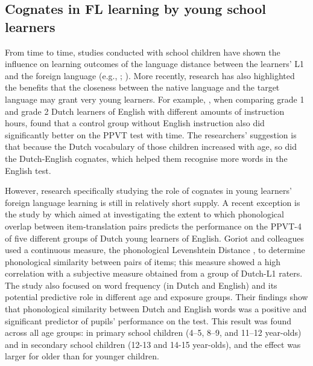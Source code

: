 \documentclass[output=paper,modfonts,nonflat,newtxmath]{langsci/langscibook}
\begin{document}
\subsection{Cognates in FL learning by young school learners}

From time to time, studies conducted with school children have shown the influence on learning outcomes of the language distance between the learners’ L1 and the foreign language (e.g., \citealt{BildSwain1989}; \citealt{DYdewallevandePoel1999}). More recently, research has also highlighted the benefits that the closeness between the native language and the target language may grant very young learners. For example, \citet{UnsworthEtAl2015}, when comparing grade 1 and grade 2 Dutch learners of English with different amounts of instruction hours, found that a control group without English instruction also did significantly better on the PPVT test with time. The researchers’ suggestion is that because the Dutch vocabulary of those children increased with age, so did the Dutch-English cognates, which helped them recognise more words in the English test.

However, research specifically studying the role of cognates in young learners’ foreign language learning is still in relatively short supply. A recent exception is the study by \citet{GoriotEtAl2018} which aimed at investigating the extent to which phonological overlap between item-translation pairs predicts the performance on the PPVT-4 of five different groups of Dutch young learners of English. Goriot and colleagues used a continuous measure, the phonological Levenshtein Distance \citep{SchepensEtAl2013}, to determine phonological similarity between pairs of items; this measure showed a high correlation with a subjective measure obtained from a group of Dutch-L1 raters. The study also focused on word frequency (in Dutch and English) and its potential predictive role in different age and exposure groups. Their findings show that phonological similarity between Dutch and English words was a positive and significant predictor of pupils’ performance on the test. This result was found across all age groups: in primary school children (4--5, 8--9, and 11--12 year-olds) and in secondary school children (12-13 and 14-15 year-olds), and the effect was larger for older than for younger children.
\end{document}

